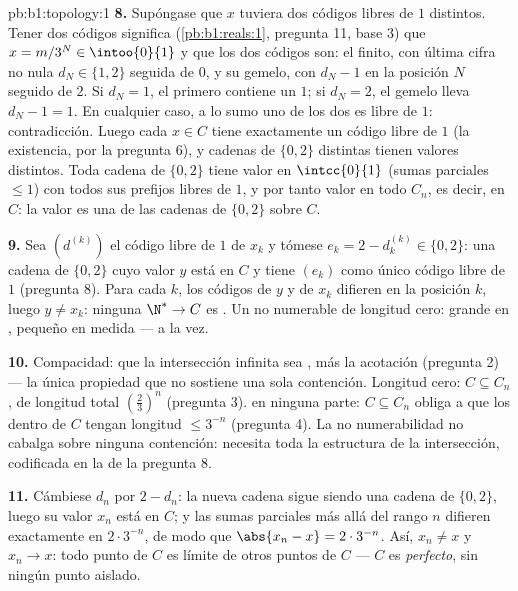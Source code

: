 \begin{solution}{pb:b1:topology:1}
\textbf{8.} Supóngase que $x$ tuviera dos códigos libres de $1$
distintos. Tener dos códigos significa (\cref{pb:b1:reals:1},
pregunta 11, base $3$) que $x = m/3^N \in \intoo{0}{1}$ y que los dos
códigos son: el finito, con última cifra no nula $d_N \in \{1, 2\}$
seguida de $0$, y su gemelo, con $d_N - 1$ en la posición $N$
seguido de $2$. Si $d_N = 1$, el primero contiene un $1$; si
$d_N = 2$, el gemelo lleva $d_N - 1 = 1$. En cualquier caso, a lo
sumo uno de los dos es libre de $1$: contradicción. Luego cada
$x \in C$ tiene exactamente un código libre de $1$ (la existencia,
por la pregunta 6), y cadenas de $\{0,2\}$ distintas tienen valores
distintos. Toda cadena de $\{0,2\}$ tiene valor en $\intcc{0}{1}$
(sumas parciales $\leq 1$) con todos sus prefijos libres de $1$, y
por tanto valor en todo $C_n$, es decir, en $C$: la  valor
es una  de las cadenas de $\{0,2\}$ sobre $C$.

\textbf{9.} Sea $(d^{(k)})$ el código libre de $1$ de $x_k$ y
tómese $e_k = 2 - d^{(k)}_k \in \{0, 2\}$: una cadena de $\{0,2\}$
cuyo valor $y$ está en $C$ y tiene $(e_k)$ como único código libre de
$1$ (pregunta 8). Para cada $k$, los códigos de $y$ y de $x_k$
difieren en la posición $k$, luego $y \neq x_k$: ninguna 
$\N^* \to C$ es . Un  no numerable de longitud
cero: grande en , pequeño en medida --- a la vez.

\textbf{10.} Compacidad: que la intersección infinita sea ,
más la acotación (pregunta 2) --- la única propiedad que no sostiene
una sola contención. Longitud cero: $C \subseteq C_n$, de longitud
total $(\frac23)^n$ (pregunta 3).  en ninguna parte:
$C \subseteq C_n$ obliga a que los  dentro de $C$ tengan
longitud $\leq 3^{-n}$ (pregunta 4). La no numerabilidad no cabalga
sobre ninguna contención: necesita toda la estructura de la
intersección, codificada en la  de la pregunta 8.

\textbf{11.} Cámbiese $d_n$ por $2 - d_n$: la nueva cadena sigue
siendo una cadena de $\{0,2\}$, luego su valor $x_n$ está en $C$; y
las sumas parciales más allá del rango $n$ difieren exactamente en
$2\cdot3^{-n}$, de modo que $\abs{x_n - x} = 2\cdot3^{-n}$. Así,
$x_n \neq x$ y $x_n \to x$: todo punto de $C$ es límite de otros
puntos de $C$ --- $C$ es \emph{perfecto}, sin ningún punto aislado.


\end{solution}
